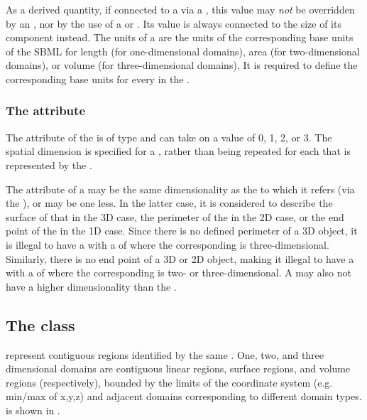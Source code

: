 As a derived quantity, if connected to a \Parameter via a \SpatialSymbolReference, this value may \emph{not} be overridden by an \InitialAssignment, nor by the use of a \Rule or \Event.  Its value is always connected to the size of its component \Domains instead.  The units of a \DomainType are the units of the corresponding base units of the SBML \Model for length (for one-dimensional domains), area (for two-dimensional domains), or volume (for three-dimensional domains).  It is required to define the corresponding base units for every \DomainType in the \Model.

\subsubsection{The \fixttspace{} attribute}
The  attribute of the \DomainType is of type  and can take on a value of 0, 1, 2, or 3. The spatial dimension is specified for a \DomainType, rather than being repeated for each \Domain that is represented by the \DomainType.

The  attribute of a \DomainType may be the same dimensionality as the \Geometry to which it refers (via the \Domain), or may be one less.  In the latter case, it is considered to describe the surface of that \Geometry in the 3D case, the perimeter of the \Geometry in the 2D case, or the end point of the \Geometry in the 1D case.  Since there is no defined perimeter of a 3D object, it is illegal to have a \DomainType with a  of  where the corresponding \Geometry is three-dimensional.  Similarly, there is no end point of a 3D or 2D object, making it illegal to have a \DomainType with a  of  where the corresponding \Geometry is two- or three-dimensional.  A \DomainType may also not have a higher dimensionality than the \Geometry.


\subsection{The  class}
\label{domain-class}
\label{listofinteriorpoints-class}
\Domains represent contiguous regions identified by the same \DomainType.  One, two, and three dimensional domains are contiguous linear regions, surface regions, and volume regions (respectively), bounded by the limits of the coordinate system (e.g. min/max of x,y,z) and adjacent domains corresponding to different domain types.   \Domain is shown in .
 
